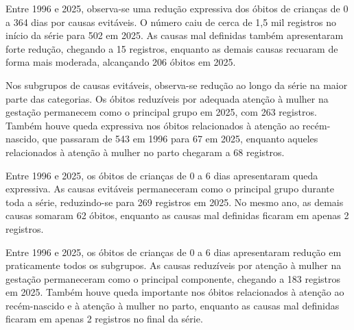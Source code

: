 
Entre 1996 e 2025, observa-se uma redução expressiva dos óbitos de crianças de 0 a 364 dias por causas evitáveis. O número caiu de cerca de 1,5 mil registros no início da série para 502 em 2025. As causas mal definidas também apresentaram forte redução, chegando a 15 registros, enquanto as demais causas recuaram de forma mais moderada, alcançando 206 óbitos em 2025.


Nos subgrupos de causas evitáveis, observa-se redução ao longo da série na maior parte das categorias. Os óbitos reduzíveis por adequada atenção à mulher na gestação permanecem como o principal grupo em 2025, com 263 registros. Também houve queda expressiva nos óbitos relacionados à atenção ao recém-nascido, que passaram de 543 em 1996 para 67 em 2025, enquanto aqueles relacionados à atenção à mulher no parto chegaram a 68 registros.


Entre 1996 e 2025, os óbitos de crianças de 0 a 6 dias apresentaram queda expressiva.  As causas evitáveis permaneceram como o principal grupo durante toda a série, reduzindo-se para 269 registros em 2025. No mesmo ano, as demais causas somaram 62 óbitos, enquanto as causas mal definidas ficaram em apenas 2 registros.


Entre 1996 e 2025, os óbitos de crianças de 0 a 6 dias apresentaram redução em praticamente todos os subgrupos. As causas reduzíveis por atenção à mulher na gestação permaneceram como o principal componente, chegando a 183 registros em 2025. Também houve queda importante nos óbitos relacionados à atenção ao recém-nascido e à atenção à mulher no parto, enquanto as causas mal definidas ficaram em apenas 2 registros no final da série.

